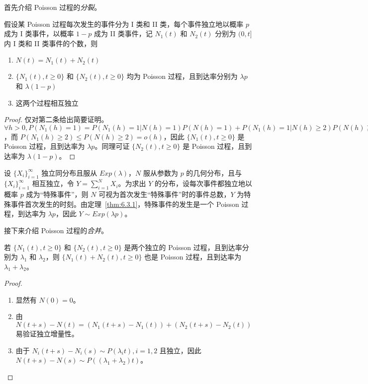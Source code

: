 \documentclass[../main.tex]{subfiles}
\begin{document}
首先介绍 Poisson 过程的\emph{分裂}。

\begin{theorem}\label{thm:6.3.1}
    假设某 Poisson 过程每次发生的事件分为 I 类和 II 类，每个事件独立地以概率 $p$ 成为 I 类事件，以概率 $1-p$ 成为 II 类事件，记 $N_1(t)$ 和 $N_2(t)$ 分别为 $(0,t]$ 内 I 类和 II 类事件的个数，则
    \begin{enumerate}
        \item $N(t)=N_1(t)+N_2(t)$
        \item $\{N_1(t),t\geq0\}$ 和 $\{N_2(t),t\geq0\}$ 均为 Poisson 过程，且到达率分别为 $\lambda p$ 和 $\lambda(1-p)$
        \item 这两个过程相互独立
    \end{enumerate}
\end{theorem}

\begin{proof}
    仅对第二条给出简要证明。$\forall h>0,P(N_1(h)=1)=P(N_1(h)=1|N(h)=1)P(N(h)=1)+P(N_1(h)=1|N(h)\geq2)P(N(h)\geq2)=p(\lambda h+o(h))+o(h)=\lambda ph+o(h)$，而 $P(N_1(h)\geq2)\leq P(N(h)\geq2)=o(h)$，因此 $\{N_1(t),t\geq0\}$ 是 Poisson 过程，且到达率为 $\lambda p$。同理可证 $\{N_2(t),t\geq0\}$ 是 Poisson 过程，且到达率为 $\lambda(1-p)$。
\end{proof}

\begin{example}
    设 $\{X_i\}_{i=1}^\infty$ 独立同分布且服从 $Exp(\lambda)$，$N$ 服从参数为 $p$ 的几何分布，且与 $\{X_i\}_{i=1}^\infty$ 相互独立，令 $Y=\sum_{i=1}^NX_i$。为求出 $Y$ 的分布，设每次事件都独立地以概率 $p$ 成为“特殊事件”，则 $N$ 可视为首次发生“特殊事件”时的事件总数，$Y$ 为特殊事件首次发生的时刻。由定理~\ref{thm:6.3.1}，特殊事件的发生是一个 Poisson 过程，到达率为 $\lambda p$，因此 $Y\sim Exp(\lambda p)$。
\end{example}

接下来介绍 Poisson 过程的\emph{合并}。

\begin{theorem}\label{thm:6.3.2}
    若 $\{N_1(t),t\geq0\}$ 和 $\{N_2(t),t\geq0\}$ 是两个独立的 Poisson 过程，且到达率分别为 $\lambda_1$ 和 $\lambda_2$，则 $\{N_1(t)+N_2(t),t\geq0\}$ 也是 Poisson 过程，且到达率为 $\lambda_1+\lambda_2$。
\end{theorem}

\begin{proof}
    \mbox{}
    \begin{enumerate}
        \item 显然有 $N(0)=0$。
        \item 由 $N(t+s)-N(t)=(N_1(t+s)-N_1(t))+(N_2(t+s)-N_2(t))$ 易验证独立增量性。
        \item 由于 $N_i(t+s)-N_i(s)\sim P(\lambda_i t),i=1,2$ 且独立，因此 $N(t+s)-N(s)\sim P((\lambda_1+\lambda_2)t)$。
    \end{enumerate}
\end{proof}
\end{document}

